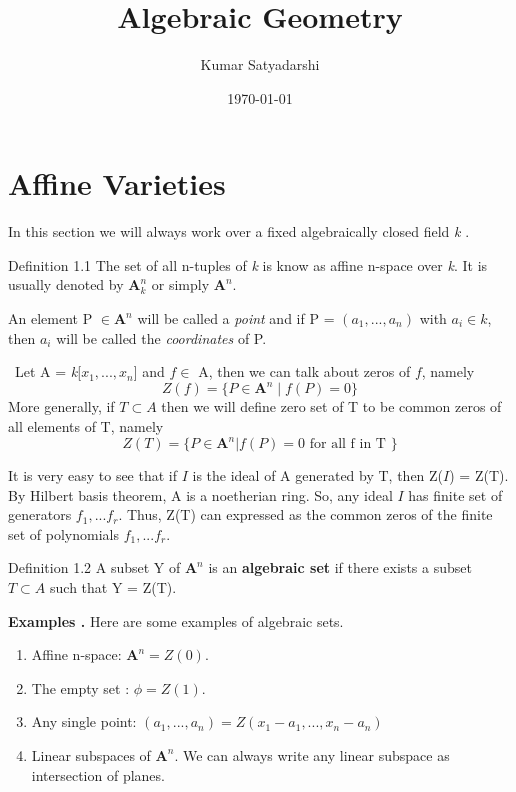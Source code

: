 \documentclass[12pt]{article}
\title{\textbf{Algebraic Geometry}}
\author{Kumar Satyadarshi}
\date{\today}
\begin{document}
\maketitle
\tableofcontents
\newpage

\section{Affine Varieties}
In this section we will always work over a fixed algebraically closed field \textit{k} .
\begin{definitionBox}{Definition 1.1}
The set of all n-tuples of \textit{k} is know as affine n-space over \textit{k}. It is usually denoted by $\mathbf{A}^{n}_{k}$ or simply $\mathbf{A}^{n}$.
\end{definitionBox}
\noindent An element P $\in \mathbf{A}^{n}$ will be called a \textit{point} and if P =  $(a_{1},...,a_{n})$ with $a_{i} \in \textit{k}$, then $a_{i}$ will be called the \textit{coordinates} of P. 
\begin{remarkBox}
\ Let A = \textit{k}[$x_{1}, ... ,x_{n}$] and $f \in $ A, then we can talk about zeros of $f$, namely $$ Z(f) = \{P \in \mathbf{A}^{n} \;|\; f(P) = 0\}$$
More generally, if $T \subset A$ then we will define zero set of T to be common zeros of all elements of T, namely $$ Z(T) = \{ P \in \mathbf{A}^{n} | f(P) = 0 \text{ for all f in T }\}  $$
\end{remarkBox}
\noindent It is very easy to see that if $I$ is the ideal of A generated by T, then Z($I$) = Z(T). By Hilbert basis theorem, A is a noetherian ring. So, any ideal $I$ has finite set of generators $f_{1},...f_{r}$. Thus, Z(T) can expressed as the common zeros of the finite set of polynomials $f_{1},...f_{r}.$
\begin{definitionBox}{Definition 1.2}
    A subset Y of $\mathbf{A}^{n}$ is an \textbf{algebraic set} if there exists a subset $T \subset A$ such that Y = Z(T).
\end{definitionBox} \noindent
\textbf{Examples .} Here are some examples of algebraic sets.
\begin{enumerate}
    \item Affine n-space: $\mathbf{A}^{n} = Z(0)$.
    \item The empty set : $ \phi = Z(1).$
    \item Any single point: $(a_{1},...,a_{n}) = Z(x_{1} - a_{1},...,x_{n} - a_{n})$
    \item Linear subspaces of $\mathbf{A}^{n}$. We can always write any linear subspace as intersection of planes.
\end{enumerate}
\end{document}

